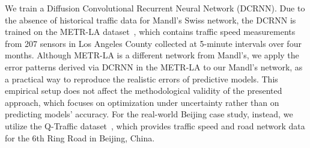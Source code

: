 \documentclass[a4paper,fleqn]{cas-sc}
\begin{document}
We train a Diffusion Convolutional Recurrent Neural Network (DCRNN). 
Due to the absence of historical traffic data for Mandl’s Swiss network, the DCRNN is trained on the METR-LA dataset~\citep{li2017diffusion}, which contains traffic speed measurements from 207 sensors in Los Angeles County collected at 5-minute intervals over four months. Although METR-LA is a different network from Mandl's, we apply the error patterns derived via DCRNN in the METR-LA to our Mandl's network, as a practical way to reproduce the realistic errors of predictive models. This empirical setup does not affect the methodological validity of the presented approach, which focuses on optimization under uncertainty rather than on predicting models' accuracy.
%
For the real-world Beijing case study, instead, we utilize the Q-Traffic dataset~\citep{liao2018deep}, which provides traffic speed and road network data for the 6th Ring Road in Beijing, China. 




\subsubsection{}
\label{sec:errorStage3}

\end{document}

